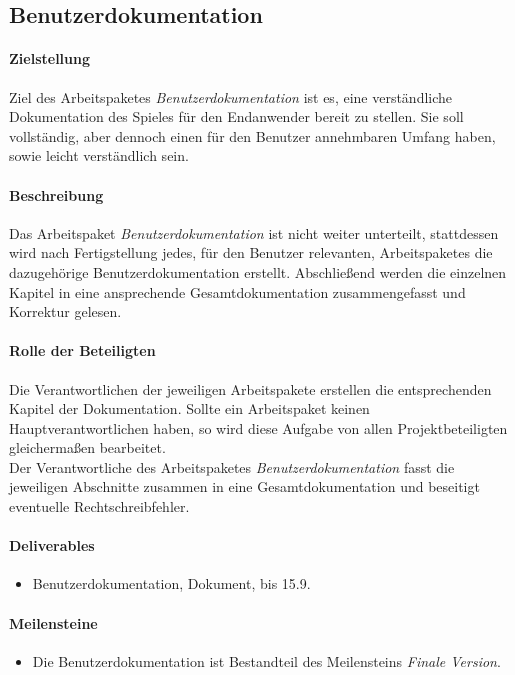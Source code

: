 \subsection{Benutzerdokumentation}

\paragraph{Zielstellung}\noindent
Ziel des Arbeitspaketes \textit{Benutzerdokumentation} ist es, eine verständliche Dokumentation des Spieles für den Endanwender bereit zu stellen. Sie soll vollständig, aber dennoch einen für den Benutzer annehmbaren Umfang haben, sowie leicht verständlich sein.

\paragraph{Beschreibung}\noindent
Das Arbeitspaket \textit{Benutzerdokumentation} ist nicht weiter unterteilt, stattdessen wird nach Fertigstellung jedes, für den Benutzer relevanten, Arbeitspaketes die dazugehörige Benutzerdokumentation erstellt. Abschließend werden die einzelnen Kapitel in eine ansprechende Gesamtdokumentation zusammengefasst und Korrektur gelesen.

\paragraph{Rolle der Beteiligten}\noindent
Die Verantwortlichen der jeweiligen Arbeitspakete erstellen die entsprechenden Kapitel der Dokumentation. Sollte ein Arbeitspaket keinen Hauptverantwortlichen haben, so wird diese Aufgabe von allen Projektbeteiligten gleichermaßen bearbeitet.\\
Der Verantwortliche des Arbeitspaketes \textit{Benutzerdokumentation} fasst die jeweiligen Abschnitte zusammen in eine Gesamtdokumentation und beseitigt eventuelle Rechtschreibfehler.

\paragraph{Deliverables}\noindent
\begin{itemize}
\item Benutzerdokumentation, Dokument, bis 15.9.
\end{itemize}

\paragraph{Meilensteine}\noindent
\begin{itemize}
\item Die Benutzerdokumentation ist Bestandteil des Meilensteins \textit{Finale Version}.
\end{itemize}